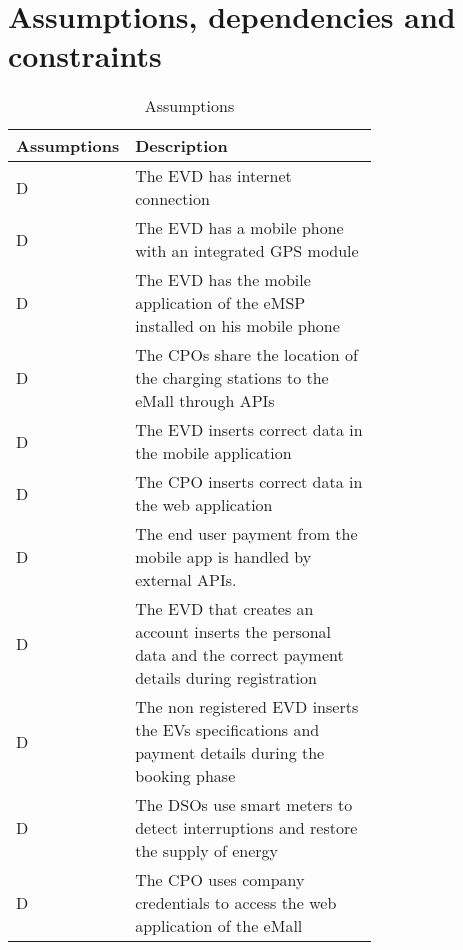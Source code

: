 \section{Assumptions, dependencies and constraints}
\label{sec:Assumptions, dependencies and constraints}%
\setcounter{ac}{1}
\newcommand{\acount}{\theac\stepcounter{ac}}
\begin{table}[h!]
    \centering
    \begin{tabular}{|l|p{0.725\linewidth}|}
     \hline
     \textbf{Assumptions} & \textbf{Description} \\
     \hline
     D\acount & The EVD has internet connection \\
     \hline
     D\acount & The EVD has a mobile phone with an integrated GPS module \\
     \hline
     D\acount & The EVD has the mobile application of the eMSP installed on his mobile phone \\
     \hline
     D\acount & The CPOs share the location of the charging stations to the eMall through APIs\\
     \hline
     D\acount & The EVD inserts correct data in the mobile application \\
     \hline
     D\acount & The CPO inserts correct data in the web application \\
     \hline
     D\acount & The end user payment from the mobile app is handled by external APIs.\\
     \hline
     D\acount & The EVD that creates an account inserts the personal data and the correct payment details during registration \\
     \hline
     D\acount & The non registered EVD inserts the EVs specifications and payment details during the booking phase \\
     \hline
     D\acount & The DSOs use smart meters to detect interruptions and restore the supply of energy \\
     \hline
     D\acount & The CPO uses company credentials to access the web application of the eMall \\
     \hline
\end{tabular}
    \caption{Assumptions}
    \label{tab:Assumptions}
\end{table}